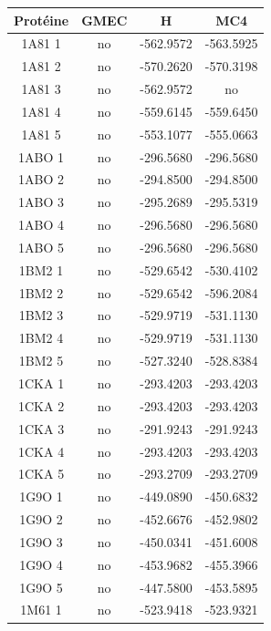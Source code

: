 \documentclass[a4paper,12pt]{article}
\begin{document}
    \begin{table}[!htbp]
      \centering

      \begin{tabular}{|c|c|c|c|}

        \hline
        \hline
        Protéine & GMEC & H & MC4 \\
        \hline
        1A81 1 & no & -562.9572 & -563.5925 \\
        1A81 2 & no & -570.2620 & -570.3198 \\
        1A81 3 & no & -562.9572 & no \\
        1A81 4 & no & -559.6145 & -559.6450 \\
        1A81 5 & no & -553.1077 & -555.0663 \\
        1ABO 1 & no & -296.5680 & -296.5680 \\
        1ABO 2 & no & -294.8500 & -294.8500 \\
        1ABO 3 & no & -295.2689 & -295.5319 \\
        1ABO 4 & no & -296.5680 & -296.5680 \\
        1ABO 5 & no & -296.5680 & -296.5680 \\
        1BM2 1 & no & -529.6542 & -530.4102 \\
        1BM2 2 & no & -529.6542 & -596.2084 \\
        1BM2 3 & no & -529.9719 & -531.1130 \\
        1BM2 4 & no & -529.9719 & -531.1130 \\
        1BM2 5 & no & -527.3240 & -528.8384 \\
        1CKA 1 & no & -293.4203 & -293.4203 \\
        1CKA 2 & no & -293.4203 & -293.4203 \\
        1CKA 3 & no & -291.9243 & -291.9243 \\
        1CKA 4 & no & -293.4203 & -293.4203 \\
        1CKA 5 & no & -293.2709 & -293.2709 \\
        1G9O 1 & no & -449.0890 & -450.6832 \\
        1G9O 2 & no & -452.6676 & -452.9802 \\
        1G9O 3 & no & -450.0341 & -451.6008 \\
        1G9O 4 & no & -453.9682 & -455.3966 \\
        1G9O 5 & no & -447.5800 & -453.5895 \\
        1M61 1 & no & -523.9418 & -523.9321 \\

\end{tabular}
\end{table}
\end{document}

